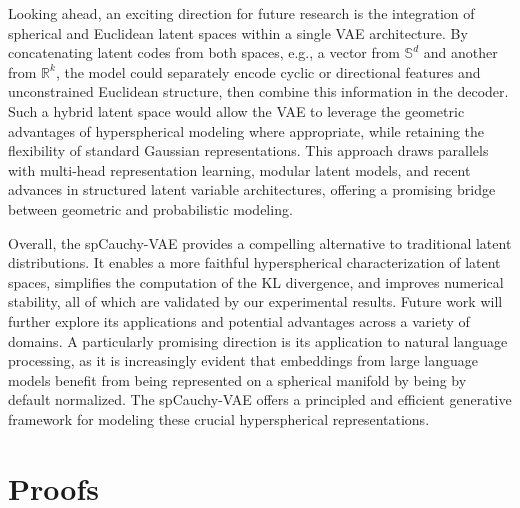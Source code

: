 \documentclass{article}
\begin{document}
Looking ahead, an exciting direction for future research is the integration of spherical and Euclidean latent spaces within a single VAE architecture. By concatenating latent codes from both spaces, e.g., a vector from \( \mathbb{S}^d \) and another from \( \mathbb{R}^k \), the model could separately encode cyclic or directional features and unconstrained Euclidean structure, then combine this information in the decoder. Such a hybrid latent space would allow the VAE to leverage the geometric advantages of hyperspherical modeling where appropriate, while retaining the flexibility of standard Gaussian representations. This approach draws parallels with multi-head representation learning, modular latent models, and recent advances in structured latent variable architectures, offering a promising bridge between geometric and probabilistic modeling.

Overall, the spCauchy-VAE provides a compelling alternative to traditional latent distributions. It enables a more faithful hyperspherical characterization of latent spaces, simplifies the computation of the KL divergence, and improves numerical stability, all of which are validated by our experimental results. Future work will further explore its applications and potential advantages across a variety of domains. A particularly promising direction is its application to natural language processing, as it is increasingly evident that embeddings from large language models benefit from being represented on a spherical manifold by being by default normalized. The spCauchy-VAE offers a principled and efficient generative framework for modeling these crucial hyperspherical representations.





\appendix
\section{Proofs}\label{appen}
\end{document}
